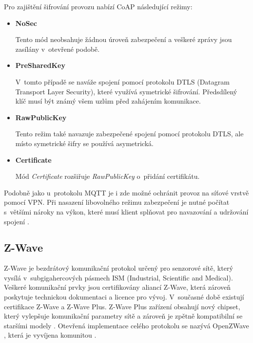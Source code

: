    Pro zajištění šifrování provozu nabízí CoAP následující režimy:
   \begin{itemize}
    \item \textbf{NoSec}
    
    Tento mód neobsahuje žádnou úroveň zabezpečení a veškeré zprávy jsou zasílány
    v~otevřené podobě. 
    
    \item \textbf{PreSharedKey}
    
    V~tomto případě se naváže spojení pomocí protokolu DTLS (Datagram Transport
    Layer Security), které využívá symetrické šifrování. Předsdílený klíč musí
    být známý všem uzlům před zahájením komunikace. 
    
    \item \textbf{RawPublicKey}
    
    Tento režim také navazuje zabezpečené spojení pomocí protokolu DTLS, ale místo
    symetrické šifry se používá asymetrická.
    
    \item \textbf{Certificate}
    
    Mód \textit{Certificate} rozšiřuje \textit{RawPublicKey} o~přidání certifikátu.
   \end{itemize}

   Podobně jako u~protokolu MQTT je i zde možné ochránit provoz na síťové
   vrstvě pomocí VPN. Při nasazení libovolného režimu zabezpečení je nutné počítat 
   s~většími nároky na výkon, které musí klient splňovat pro navazování a udržování 
   spojení \cite{coap}.
   
  \subsection{Z-Wave}
  
  Z-Wave je bezdrátový komunikační protokol určený pro senzorové sítě, který vysílá 
  v~subgigahercových pásmech ISM (Industrial, Scientific and Medical). Veškeré komunikační
  prvky jsou certifikovány aliancí Z-Wave, která zároveň poskytuje technickou dokumentaci a
  licence pro vývoj. V~současné době existují certifikace Z-Wave a Z-Wave Plus. 
  Z-Wave Plus zařízení obsahují nový chipset, který vylepšuje komunikační parametry
  sítě a zároveň je zpětně kompatibilní se staršími modely \cite{z-plus}.
  Otevřená implementace celého protokolu se nazývá OpenZWave \cite{openzwave}, která
  je vyvíjena komunitou \cite{cesnet-survey}.
 
